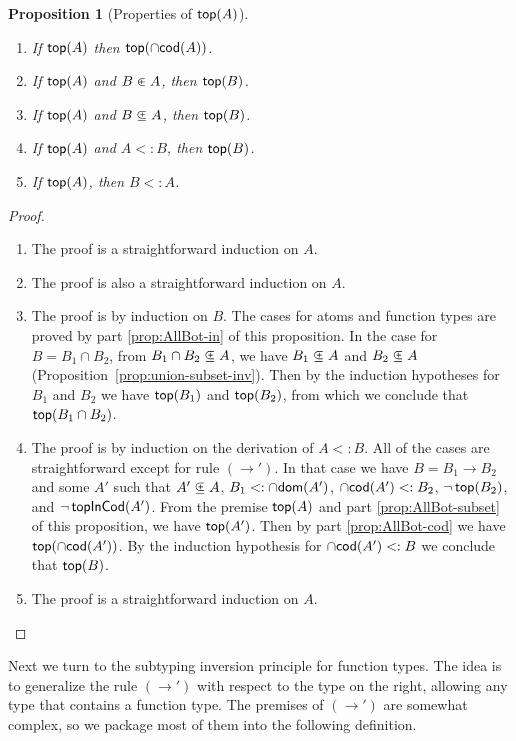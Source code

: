 \documentclass{article}
\newtheorem{proposition}[theorem]{Proposition}
\begin{document}
\begin{proposition}[Properties of $\mathsf{top}(A)$]\ \label{prop:top}
  \begin{enumerate}
  \item If $\mathsf{top}(A)$ then $\mathsf{top}(\cap\mathsf{cod}(A))$.\label{prop:AllBot-cod}
  \item If $\mathsf{top}(A)$ and $B \inplus A$, then $\mathsf{top}(B)$.\label{prop:AllBot-in}
  \item If $\mathsf{top}(A)$ and $B \subsetpluseq A$, then $\mathsf{top}(B)$.\label{prop:AllBot-subset}
  \item If $\mathsf{top}(A)$ and $A <: B$, then $\mathsf{top}(B)$.\label{prop:AllBot-⊑}
  \item If $\mathsf{top}(A)$, then $B <: A$.\label{prop:AllBot-⊑-any}
  \end{enumerate}
\end{proposition}
\begin{proof}\
  \begin{enumerate}
  \item The proof is a straightforward induction on $A$.
  \item The proof is also a straightforward induction on $A$.
  \item The proof is by induction on $B$. The cases for atoms and
    function types are proved by part \ref{prop:AllBot-in} of
    this proposition. In the case for
    $B = B_1 \cap B_2$, from $B_1 \cap B_2 \subsetpluseq A$, we have
    $B_1 \subsetpluseq A$ and $B_2 \subsetpluseq A$
    (Proposition~\ref{prop:union-subset-inv}).
    Then by the induction hypotheses for $B_1$ and $B_2$ we have
    $\mathsf{top}(B_1)$ and $\mathsf{top}(B_2)$, from which we conclude
    that $\mathsf{top}(B_1 \cap B_2)$.
  \item The proof is by induction on the derivation of $A <: B$.
    All of the cases are straightforward except for rule $(\to')$.
    In that case we have $B = B_1 \to B_2$ and some $A'$ such that
    $A' \subsetpluseq A$, $B_1 <: \cap\mathsf{dom}(A')$, $\cap\mathsf{cod}(A') <: B_2$, $\neg\,\mathsf{top}(B_2)$,
    and $\neg\,\mathsf{topInCod}(A')$. From the premise $\mathsf{top}(A)$
    and part \ref{prop:AllBot-subset} of this proposition, we
    have $\mathsf{top}(A')$. Then by part \ref{prop:AllBot-cod}
    we have $\mathsf{top}(\cap\mathsf{cod}(A'))$. By the induction hypothesis
    for $\cap\mathsf{cod}(A') <: B$ we conclude that $\mathsf{top}(B)$.
  \item The proof is a straightforward induction on $A$.
  \end{enumerate}
\end{proof}

Next we turn to the subtyping inversion principle for function types.
The idea is to generalize the rule $(\to')$ with respect to the type on
the right, allowing any type that contains a function type.  The
premises of $(\to')$ are somewhat complex, so we package most of them
into the following definition.
\end{document}

